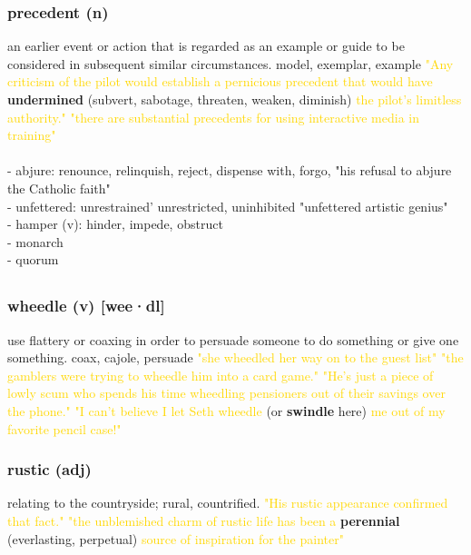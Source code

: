 \documentclass{proc}
\begin{document}
		\subsubsection{\textcolor{brickred}{precedent} (n)}
		an earlier event or action that is regarded as an example or guide to be considered in subsequent similar circumstances.
		model,
		exemplar,
		example
		\textcolor{gold}{"Any criticism of the pilot would 
		establish a pernicious precedent that would have }
		\textbf{undermined} (subvert,
		sabotage,
		threaten,
		weaken,
		diminish) \textcolor{gold} {the pilot's limitless authority."
		"there are substantial precedents for using interactive media in training"}
		\\
		\\
		- abjure:
		renounce,
		relinquish,
		reject,
		dispense with,
		forgo,
		"his refusal to abjure the Catholic faith"\\
		- unfettered: unrestrained'
		unrestricted,
		uninhibited
		"unfettered artistic genius"\\
		- hamper (v): hinder, impede, obstruct\\
		- monarch\\
		- quorum
		
		\newpage
		\subsection{}
		\subsubsection{\textcolor{brickred}{wheedle} (v) [wee·dl]}
		use flattery or coaxing in order to persuade someone to do something or give one something. 
		coax,
		cajole,
		persuade
		\textcolor{gold}{"she wheedled her way on to the guest list"
		"the gamblers 
		were trying to wheedle him into a card game."
		"He's just a piece of lowly scum who spends his time wheedling pensioners out of their savings over the phone."
		"I can't believe I let Seth wheedle }(or \textbf{swindle} here) \textcolor{gold}{ me out of my favorite pencil case!"}
		
		\subsubsection{\textcolor{brickred}{rustic} (adj)}
		relating to the countryside; rural, countrified.
		\textcolor{gold}{"His rustic appearance confirmed 
		that fact."
		"the unblemished charm of rustic life has been a } \textbf{perennial} (everlasting, perpetual) \textcolor{gold}{source of inspiration for the painter"}
		
\end{document}
